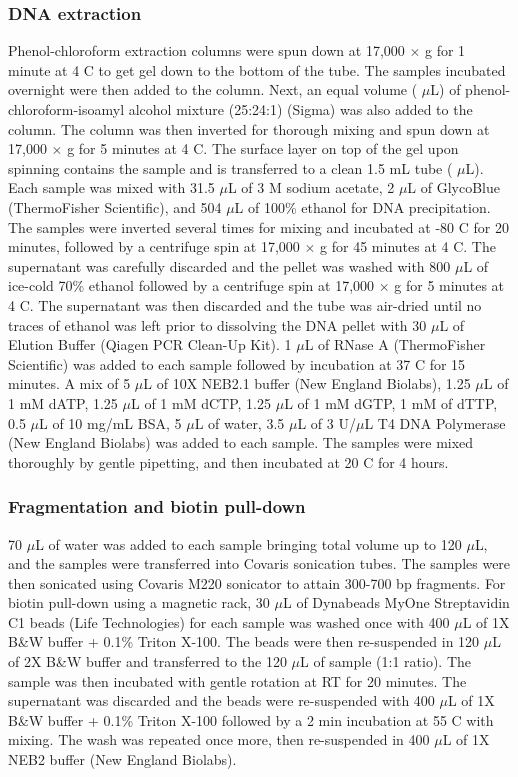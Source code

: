 \subsubsection{DNA extraction}

Phenol-chloroform extraction columns were spun down at 17,000 $\times$ g for 1 minute at 4 \textdegree C to get gel down to the bottom of the tube.
The samples incubated overnight were then added to the column.
Next, an equal volume ( $\mu$L) of phenol-chloroform-isoamyl alcohol mixture (25:24:1) (Sigma) was also added to the column.
The column was then inverted for thorough mixing and spun down at 17,000 $\times$ g for 5 minutes at 4 \textdegree C.
The surface layer on top of the gel upon spinning contains the sample and is transferred to a clean 1.5 mL tube ( $\mu$L).
Each sample was mixed with 31.5 $\mu$L of 3 M sodium acetate, 2 $\mu$L of GlycoBlue (ThermoFisher Scientific), and 504 $\mu$L of 100\% ethanol for DNA precipitation.
The samples were inverted several times for mixing and incubated at -80 \textdegree C for 20 minutes, followed by a centrifuge spin at 17,000 $\times$ g for 45 minutes at 4 \textdegree C.
The supernatant was carefully discarded and the pellet was washed with 800 $\mu$L of ice-cold 70\% ethanol followed by a centrifuge spin at 17,000 $\times$ g for 5 minutes at 4 \textdegree C.
The supernatant was then discarded and the tube was air-dried until no traces of ethanol was left prior to dissolving the DNA pellet with 30 $\mu$L of Elution Buffer (Qiagen PCR Clean-Up Kit).
1 $\mu$L of RNase A (ThermoFisher Scientific) was added to each sample followed by incubation at 37 \textdegree C for 15 minutes.
A mix of 5 $\mu$L of 10X NEB2.1 buffer (New England Biolabs), 1.25 $\mu$L of 1 mM dATP, 1.25 $\mu$L of 1 mM dCTP, 1.25 $\mu$L of 1 mM dGTP, 1 mM of dTTP, 0.5 $\mu$L of 10 mg/mL BSA, 5 $\mu$L of water, 3.5 $\mu$L of 3 U/$\mu$L T4 DNA Polymerase (New England Biolabs) was added to each sample.
The samples were mixed thoroughly by gentle pipetting, and then incubated at 20 \textdegree C for 4 hours.

\subsubsection{Fragmentation and biotin pull-down}

70 $\mu$L of water was added to each sample bringing total volume up to 120 $\mu$L, and the samples were transferred into Covaris sonication tubes.
The samples were then sonicated using Covaris M220 sonicator to attain 300-700 bp fragments.
For biotin pull-down using a magnetic rack, 30 $\mu$L of Dynabeads MyOne Streptavidin C1 beads (Life Technologies) for each sample was washed once with 400 $\mu$L of 1X B\&W buffer + 0.1\% Triton X-100.
The beads were then re-suspended in 120 $\mu$L of 2X B\&W buffer and transferred to the 120 $\mu$L of sample (1:1 ratio).
The sample was then incubated with gentle rotation at RT for 20 minutes.
The supernatant was discarded and the beads were re-suspended with 400 $\mu$L of 1X B\&W buffer + 0.1\% Triton X-100 followed by a 2 min incubation at 55 \textdegree C with mixing.
The wash was repeated once more, then re-suspended in 400 $\mu$L of 1X NEB2 buffer (New England Biolabs).

